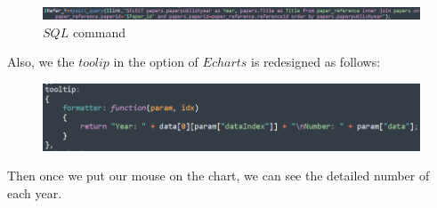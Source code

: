 \documentclass{article}
\begin{document}
	\begin{figure}[H]
		\centering
		
	\end{figure}
	\begin{figure}[H]
		\centering
		\includegraphics[width=1\linewidth]{p_14.png}
		\caption{\(SQL\) command}
	\end{figure}
	Also, we the \(toolip\) in the option of \(Echarts\) is redesigned as follows:
	\begin{figure}[H]
		\centering
		\includegraphics[width=0.7\linewidth]{p_16.png}
	\end{figure}
	Then once we put our mouse on the chart, we can see the detailed number of each year.
\end{document}
